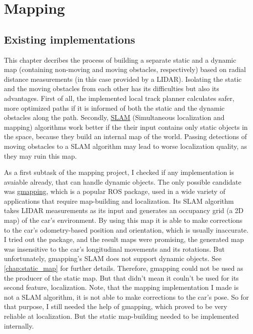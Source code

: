 \chapter{Mapping}
\label{chap:mapping}

\section{Existing implementations}
This chapter decribes the process of building a separate static and a dynamic map (containing non-moving and moving obstacles, respectively) based on radial distance measurements (in this case provided by a LIDAR). Isolating the static and the moving obstacles from each other has its difficulties but also its advantages. First of all, the implemented local track planner calculates safer, more optimized paths if it is informed of both the static and the dynamic obstacles along the path. Secondly, \href{https://en.wikipedia.org/wiki/Simultaneous_localization_and_mapping}{SLAM} (Simultaneous localization and mapping) algorithms work better if the their input contains only static objects in the space, because they build an internal map of the world. Passing detections of moving obstacles to a SLAM algorithm may lead to worse localization quality, as they may ruin this map.

As a first subtask of the mapping project, I checked if any implementation is avaiable already, that can handle dynamic objects. The only possible candidate was \href{http://wiki.ros.org/gmapping}{gmapping}, which is a popular ROS package, used in a wide variety of applications that require map-building and localization. Its SLAM algorithm takes LIDAR measurements as its input and generates an occupancy grid (a 2D map) of the car's environment. By using this map it is able to make corrections to the car's odometry-based position and orientation, which is usually inaccurate. I tried out the package, and the result maps were promising, the generated map was insensitive to the car's longitudinal movements and its rotations. But unfortunately, gmapping's SLAM does not support dynamic objects. See \ref{chap:static_map} for further details. Therefore, gmapping could not be used as the producer of the static map. But that didn't mean it couln't be used for its second feature, localization. Note, that the mapping implementation I made is not a SLAM algorithm, it is not able to make corrections to the car's pose. So for that purpose, I still needed the help of gmapping, which proved to be very reliable at localization. But the static map-building needed to be implemented internally.

